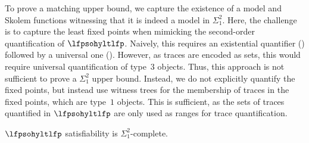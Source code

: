 To prove a matching upper bound, we capture the existence of a model and Skolem functions witnessing that it is indeed a model in $\Sigma_1^2$.
Here, the challenge is to capture the least fixed points when mimicking the second-order quantification of $\lfpsohyltlfp$. Naively, this requires an existential quantifier () followed by a universal one ().
However, as traces are encoded as sets, this would require universal quantification of type~$3$ objects.
Thus, this approach is not sufficient to prove a $\Sigma_1^2$ upper bound.
Instead, we do not explicitly quantify the fixed points, but instead use witness trees for the membership of traces in the fixed points, which are type~$1$ objects.
This is sufficient, as the sets of traces quantified in $\lfpsohyltlfp$ are only used as ranges for trace quantification.


\begin{thm}
\label{thm_satcomplexity_lfp_ss}
$\lfpsohyltlfp$ satisfiability is $\Sigma^2_1$-complete.
\end{thm}

